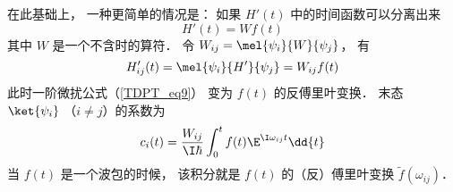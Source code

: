 在此基础上， 一种更简单的情况是： 如果 $H'(t)$ 中的时间函数可以分离出来
\begin{equation}
H'(t) = W f(t)
\end{equation}
其中 $W$ 是一个不含时的算符． 令 $W_{ij} = \mel{\psi_i}{W}{\psi_j}$， 有
\begin{equation}
H'_{ij}(t) = \mel{\psi_i}{H'}{\psi_j} = W_{ij}f(t)
\end{equation}
此时一阶微扰公式（\autoref{TDPT_eq9}） 变为 $f(t)$ 的反傅里叶变换． 末态 $\ket{\psi_i}$ （$i \neq j$）的系数为
\begin{equation}
c_i(t) = \frac{W_{ij}}{\I\hbar} \int_0^t f(t)\E^{\I\omega_{ij} t} \dd{t}
\end{equation}
当 $f(t)$ 是一个波包的时候， 该积分就是 $f(t)$ 的（反）傅里叶变换 $\tilde f(\omega_{ij})$．
